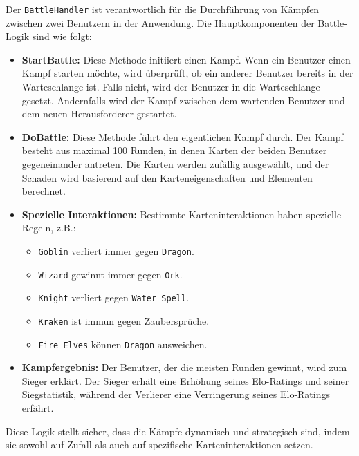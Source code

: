 \documentclass{article}
\begin{document}
Der \texttt{BattleHandler} ist verantwortlich für die Durchführung von Kämpfen zwischen zwei Benutzern in der Anwendung. Die Hauptkomponenten der Battle-Logik sind wie folgt:

\begin{itemize}
    \item \textbf{StartBattle:} Diese Methode initiiert einen Kampf. Wenn ein Benutzer einen Kampf starten möchte, wird überprüft, ob ein anderer Benutzer bereits in der Warteschlange ist. Falls nicht, wird der Benutzer in die Warteschlange gesetzt. Andernfalls wird der Kampf zwischen dem wartenden Benutzer und dem neuen Herausforderer gestartet.

    \item \textbf{DoBattle:} Diese Methode führt den eigentlichen Kampf durch. Der Kampf besteht aus maximal 100 Runden, in denen Karten der beiden Benutzer gegeneinander antreten. Die Karten werden zufällig ausgewählt, und der Schaden wird basierend auf den Karteneigenschaften und Elementen berechnet.

    \item \textbf{Spezielle Interaktionen:} Bestimmte Karteninteraktionen haben spezielle Regeln, z.B.:
    \begin{itemize}
        \item \texttt{Goblin} verliert immer gegen \texttt{Dragon}.
        \item \texttt{Wizard} gewinnt immer gegen \texttt{Ork}.
        \item \texttt{Knight} verliert gegen \texttt{Water Spell}.
        \item \texttt{Kraken} ist immun gegen Zaubersprüche.
        \item \texttt{Fire Elves} können \texttt{Dragon} ausweichen.
    \end{itemize}

    \item \textbf{Kampfergebnis:} Der Benutzer, der die meisten Runden gewinnt, wird zum Sieger erklärt. Der Sieger erhält eine Erhöhung seines Elo-Ratings und seiner Siegstatistik, während der Verlierer eine Verringerung seines Elo-Ratings erfährt.
\end{itemize}

Diese Logik stellt sicher, dass die Kämpfe dynamisch und strategisch sind, indem sie sowohl auf Zufall als auch auf spezifische Karteninteraktionen setzen.
\end{document}
